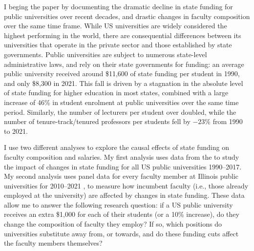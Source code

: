 I beging the paper by documenting the dramatic decline in state funding for public universities over recent decades, and drastic changes in faculty composition over the same time frame.
While US universities are widely considered the highest performing in the world, there are consequential differences between its universities that operate in the private sector and those established by state governments.
Public universities are subject to numerous state-level administrative laws, and rely on their state governments for funding: an average public university received around \$11,600 of state funding per student in 1990, and only \$8,300 in 2021.
This fall is driven by a stagnation in the absolute level of state funding for higher education in most states, combined with a large increase of 46\% in student enrolment at public universities over the same time period.
Similarly, the number of lecturers per student over doubled, while the number of tenure-track/tenured professors per students fell by $-23$\% from 1990 to 2021.

I use two different analyses to explore the causal effects of state funding on faculty composition and salaries.
My first analysis uses data from the \cite{ipeds} to study the impact of changes in state funding for all US public universities 1990--2017.
My second analysis uses panel data for every faculty member at Illinois public universities for 2010--2021 \citep{ibhed}, to measure how incumbent faculty (i.e., those already employed at the university) are affected by changes in state funding.
These data allow me to answer the following research question: if a US public university receives an extra \$1,000 for each of their students (or a 10\% increase), do they change the composition of faculty they employ?
If so, which positions do universities substitute away from, or towards, and do these funding cuts affect the faculty members themselves?

